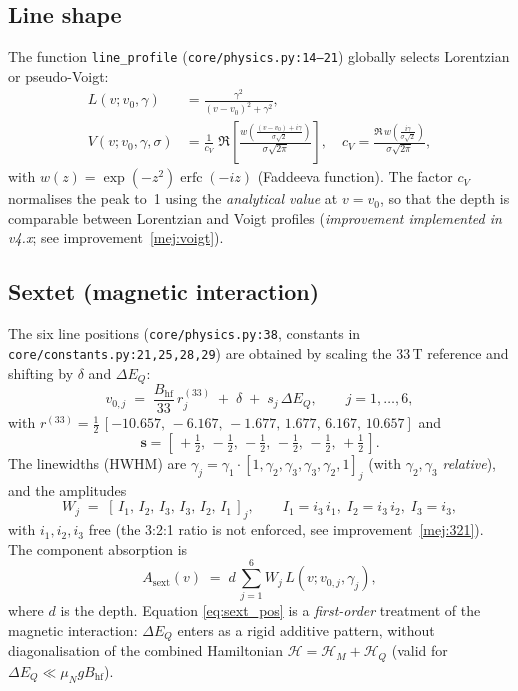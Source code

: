 \documentclass[11pt,a4paper]{article}
\newcommand{\BHF}{B_{\mathrm{hf}}}
\newcommand{\dEQ}{\Delta E_{Q}}
\newcommand{\code}[1]{\texttt{\small #1}}
\newcommand{\file}[1]{\textcolor{black!70}{\texttt{\small #1}}}
\begin{document}
\subsection{Line shape}
The function \code{line\_profile} (\file{core/physics.py:14--21}) globally selects Lorentzian or pseudo-Voigt:
\begin{align}
  L(v;v_0,\gamma) &= \frac{\gamma^{2}}{(v-v_0)^{2}+\gamma^{2}}, \label{eq:lorentz}\\
  V(v;v_0,\gamma,\sigma) &= \frac{1}{c_V}\;\Re\!\left[\frac{w\!\left(\frac{(v-v_0)+i\gamma}{\sigma\sqrt 2}\right)}{\sigma\sqrt{2\pi}}\right], \quad c_V = \frac{\Re\,w\!\left(\frac{i\gamma}{\sigma\sqrt 2}\right)}{\sigma\sqrt{2\pi}}, \label{eq:voigt}
\end{align}
with $w(z)=\exp(-z^{2})\operatorname{erfc}(-iz)$ (Faddeeva function). The factor $c_V$ normalises the peak to~1 using the \emph{analytical value} at $v=v_0$, so that the depth is comparable between Lorentzian and Voigt profiles (\emph{improvement implemented in v4.x}; see improvement~\ref{mej:voigt}).

\subsection{Sextet (magnetic interaction)}\label{sec:sextet}
The six line positions (\file{core/physics.py:38}, constants in \file{core/constants.py:21,25,28,29}) are obtained by scaling the 33\,T reference and shifting by $\delta$ and $\dEQ$:
\begin{equation}
  v_{0,j} \;=\; \frac{\BHF}{33}\,r_j^{(33)} \;+\; \delta \;+\; s_j\,\dEQ,
  \qquad j=1,\dots,6,
  \label{eq:sext_pos}
\end{equation}
with $r^{(33)}=\tfrac12\,[-10.657,\,-6.167,\,-1.677,\,1.677,\,6.167,\,10.657]$ and
\begin{equation}
  \bm s = [\,+\tfrac12,\,-\tfrac12,\,-\tfrac12,\,-\tfrac12,\,-\tfrac12,\,+\tfrac12\,].
\end{equation}
The linewidths (HWHM) are $\gamma_j = \gamma_1\cdot[1,\gamma_2,\gamma_3,\gamma_3,\gamma_2,1]_j$ (with $\gamma_2,\gamma_3$ \emph{relative}), and the amplitudes
\begin{equation}
  W_j \;=\; [\,I_1,\,I_2,\,I_3,\,I_3,\,I_2,\,I_1\,]_j,
  \qquad
  I_1 = i_3\,i_1,\; I_2 = i_3\,i_2,\; I_3 = i_3,
\end{equation}
with $i_1,i_2,i_3$ free (the 3:2:1 ratio is not enforced, see improvement~\ref{mej:321}). The component absorption is
\begin{equation}
  A_{\text{sext}}(v) \;=\; d\,\sum_{j=1}^{6} W_j\, L(v;v_{0,j},\gamma_j),
  \label{eq:Asext}
\end{equation}
where $d$ is the depth. Equation \eqref{eq:sext_pos} is a \emph{first-order} treatment of the magnetic interaction: $\dEQ$ enters as a rigid additive pattern, without diagonalisation of the combined Hamiltonian $\mathcal H = \mathcal H_{M}+\mathcal H_{Q}$ (valid for $\dEQ\ll \mu_N g \BHF$).
\end{document}
